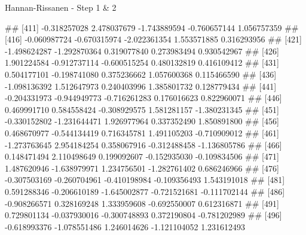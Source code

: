 \documentclass[11pt,ignorenonframetext,]{beamer}
\newenvironment{Shaded}{}{}
\newcommand{\NormalTok}[1]{#1}
\let\oldShaded\Shaded
\let\endoldShaded\endShaded
\renewenvironment{Shaded}{\footnotesize\begin{spacing}{0.9}\oldShaded}{\endoldShaded\end{spacing}}
\begin{document}
\begin{frame}[fragile,t]{Hannan-Rissanen - Step 1 \& 2}
\begin{Shaded}
\begin{Highlighting}[]
\NormalTok{## [411] -0.318257028  2.478037679 -1.743889594 -0.760657144  1.056757359}
\NormalTok{## [416] -0.060987724 -0.670315974 -2.022361354  1.553571885  0.316293956}
\NormalTok{## [421] -1.498624287 -1.292870364  0.319077840  0.273983494  0.930542967}
\NormalTok{## [426]  1.901224584 -0.912737114 -0.600515254  0.480132819  0.416109412}
\NormalTok{## [431]  0.504177101 -0.198741080  0.375236662  1.057600368  0.115466590}
\NormalTok{## [436] -1.098136392  1.512647973  0.240403996  1.385801732  0.128779434}
\NormalTok{## [441] -0.204331973 -0.944949773 -0.716261283  0.176016623  0.822960071}
\NormalTok{## [446]  0.469991710  0.584558424 -0.308929575  1.581281157 -1.380231345}
\NormalTok{## [451] -0.330152802 -1.231644471  1.926977964  0.337352490  1.850891800}
\NormalTok{## [456]  0.468670977 -0.544134419  0.716345781  1.491105203 -0.710909012}
\NormalTok{## [461] -1.273763645  2.954184254  0.358067916 -0.312488458 -1.136805786}
\NormalTok{## [466]  0.148471494  2.110498649  0.199092607 -0.152935030 -0.109834506}
\NormalTok{## [471]  1.487620946 -1.638979971  1.234756501 -1.282761402  0.686246966}
\NormalTok{## [476] -0.307503169 -0.260704961 -0.410198984 -0.109356493  1.543191018}
\NormalTok{## [481]  0.591288346 -0.206610189 -1.645002877 -0.721521681 -0.111702144}
\NormalTok{## [486] -0.908266571  0.328169248  1.333959608 -0.692550007  0.612316871}
\NormalTok{## [491]  0.729801134 -0.037930016 -0.300748893  0.372190804 -0.781202989}
\NormalTok{## [496] -0.618993376 -1.078551486  1.246014626 -1.121104052  1.231612493}
\end{Highlighting}
\end{Shaded}

\end{frame}
\end{document}
